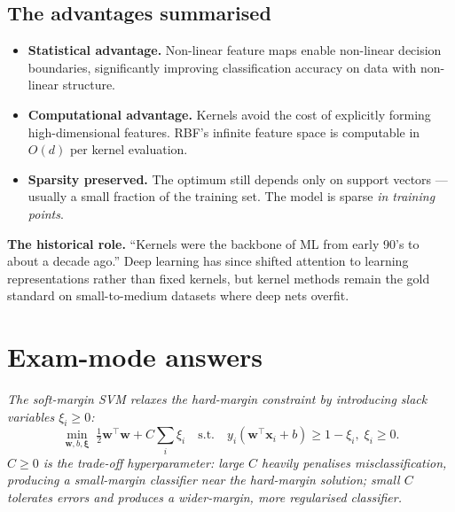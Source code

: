 \documentclass[11pt, a4paper]{article}
\begin{document}
\subsection{The advantages summarised}

\begin{itemize}
  \item \textbf{Statistical advantage.} Non-linear feature maps enable non-linear decision boundaries, significantly improving classification accuracy on data with non-linear structure.
  \item \textbf{Computational advantage.} Kernels avoid the cost of explicitly forming high-dimensional features. RBF's infinite feature space is computable in $O(d)$ per kernel evaluation.
  \item \textbf{Sparsity preserved.} The optimum still depends only on support vectors — usually a small fraction of the training set. The model is sparse \emph{in training points}.
\end{itemize}

\textbf{The historical role.} ``Kernels were the backbone of ML from early 90's to about a decade ago.'' Deep learning has since shifted attention to learning representations rather than fixed kernels, but kernel methods remain the gold standard on small-to-medium datasets where deep nets overfit.

\section{Exam-mode answers}

\begin{exambox}
\textit{The soft-margin SVM relaxes the hard-margin constraint by introducing slack variables $\xi_i \ge 0$:}
\[
\min_{\mathbf{w}, b, \boldsymbol\xi}\;\tfrac{1}{2}\mathbf{w}^\top\mathbf{w} + C\sum_i \xi_i \quad\text{s.t.}\quad y_i(\mathbf{w}^\top\mathbf{x}_i + b) \ge 1 - \xi_i, \;\xi_i \ge 0.
\]
\textit{$C \ge 0$ is the trade-off hyperparameter: large $C$ heavily penalises misclassification, producing a small-margin classifier near the hard-margin solution; small $C$ tolerates errors and produces a wider-margin, more regularised classifier.}
\end{exambox}
\end{document}

